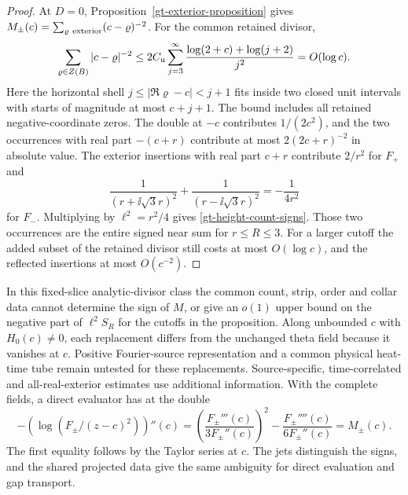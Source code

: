 \begin{proof}
At \(D=0\), Proposition~\ref{gt-exterior-proposition} gives
\(M_\pm(c)=\sum_{\varrho\ {\rm exterior}}(c-\varrho)^{-2}\).
For the common retained divisor,
\[
 \sum_{\varrho\in Z(B)}|c-\varrho|^{-2}
 \le 2C_{\rm u}\sum_{j=3}^\infty
         \frac{\log(2+c)+\log(j+2)}{j^2}=O(\log c).
\]
Here the horizontal shell \(j\le|\Re\varrho-c|<j+1\) fits
inside two closed unit intervals with starts of magnitude at
most \(c+j+1\). The bound includes all retained negative-coordinate
zeros. The double at \(-c\) contributes \(1/(2c^2)\), and the
two occurrences with real part \(-(c+r)\) contribute at most
\(2(2c+r)^{-2}\) in absolute value. The exterior insertions
with real part \(c+r\) contribute \(2/r^2\) for \(F_+\) and
\[
 \frac{1}{(r+\ii\sqrt3 r)^2}+\frac{1}{(r-\ii\sqrt3 r)^2}
       =-\frac{1}{4r^2}
\]
for \(F_-\). Multiplying by \(\ell^2=r^2/4\) gives
\eqref{gt-height-count-signs}. Those two occurrences are
the entire signed near sum for \(r\le R\le3\). For a larger
cutoff the added subset of the retained divisor still costs
at most \(O(\log c)\), and the reflected insertions at most
\(O(c^{-2})\).
\end{proof}

In this fixed-slice analytic-divisor class the common count, strip,
order and collar data cannot determine the sign of \(M\), or give
an \(o(1)\) upper bound on the negative part of \(\ell^2S_R\)
for the cutoffs in the proposition. Along unbounded \(c\) with
\(H_0(c)\ne0\), each replacement differs from the unchanged theta
field because it vanishes at \(c\). Positive Fourier-source
representation and a common physical heat-time tube remain
untested for these replacements. Source-specific, time-correlated
and all-real-exterior estimates use additional information.
With the complete fields, a direct evaluator has at the double
\[
 -(\log(F_\pm/(z-c)^2))''(c)
  =\left(\frac{F_\pm'''(c)}{3F_\pm''(c)}\right)^2
    -\frac{F_\pm''''(c)}{6F_\pm''(c)}
  = M_\pm(c).
\]
The first equality follows by the Taylor series at \(c\).
The jets distinguish the signs, and the shared projected data
give the same ambiguity for direct evaluation and gap transport.


